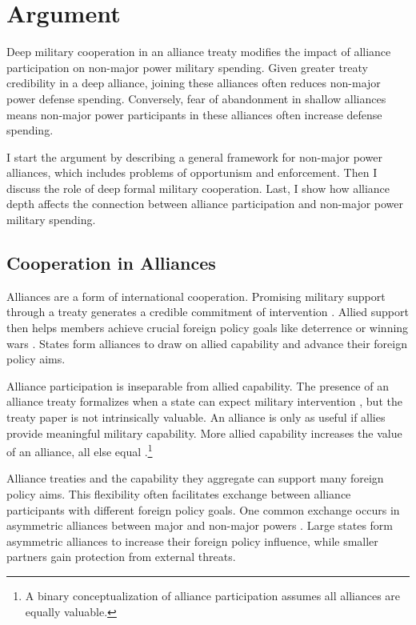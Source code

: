 \documentclass[12pt]{article}
\begin{document}
\section{Argument}

Deep military cooperation in an alliance treaty modifies the impact of alliance participation on non-major power military spending.
Given greater treaty credibility in a deep alliance, joining these alliances often reduces non-major power defense spending.
Conversely, fear of abandonment in shallow alliances means non-major power participants in these alliances often increase defense spending.  


I start the argument by describing a general framework for non-major power alliances, which includes problems of opportunism and enforcement. 
Then I discuss the role of deep formal military cooperation. 
Last, I show how alliance depth affects the connection between alliance participation and non-major power military spending. 


\subsection{Cooperation in Alliances}

Alliances are a form of international cooperation. 
Promising military support through a treaty generates a credible commitment of intervention \citep{Fearon1997, Morrow2000}. 
Allied support then helps members achieve crucial foreign policy goals like deterrence or winning wars \citep{Walt1990, Snyder1997}. 
States form alliances to draw on allied capability \citep{FordhamPoast2014} and advance their foreign policy aims.


Alliance participation is inseparable from allied capability. 
The presence of an alliance treaty formalizes when a state can expect military intervention \citep{Morrow2000}, but the treaty paper is not intrinsically valuable. 
An alliance is only as useful if allies provide meaningful military capability. 
More allied capability increases the value of an alliance, all else equal \citep{Johnsonetal2015}.\footnote{A binary conceptualization of alliance participation assumes all alliances are equally valuable.}


Alliance treaties and the capability they aggregate can support many foreign policy aims.
This flexibility often facilitates exchange between alliance participants with different foreign policy goals. 
One common exchange occurs in asymmetric alliances between major and non-major powers \citep{Morrow1991}. 
Large states form asymmetric alliances to increase their foreign policy influence, while smaller partners gain protection from external threats. 
\end{document}
